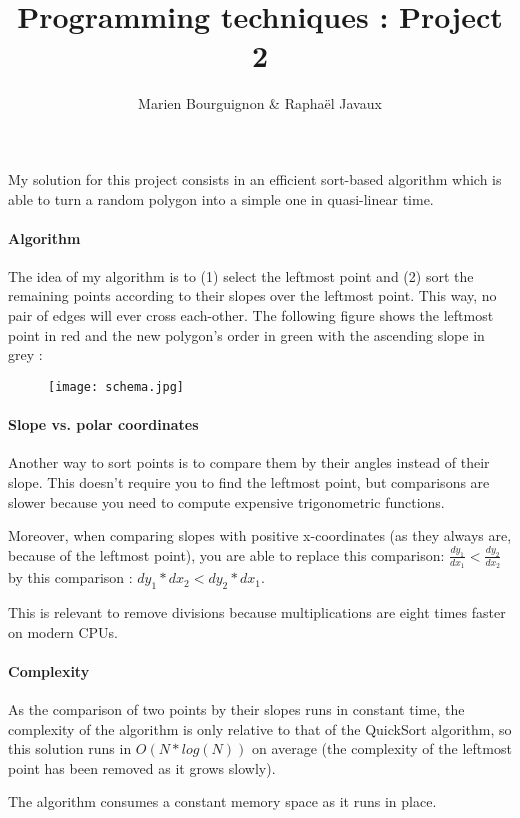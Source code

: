 \documentclass[a4paper]{article}
\title{Programming techniques : Project 2}
\author{Marien Bourguignon \& Raphaël Javaux}
\date{}
\begin{document}
\maketitle

    \paragraph{} My solution for this project consists in an efficient 
sort-based algorithm which is able to turn a random polygon into a simple one
in quasi-linear time.

    \paragraph{Algorithm} The idea of my algorithm is to (1) select the 
leftmost point and (2) sort the remaining points according to their slopes over
the leftmost point. This way, no pair of edges will ever cross each-other.
The following figure shows the leftmost point in red and the new polygon's order
in green with the ascending slope in grey :

    \begin{figure}[h]
        \centering
        \texttt{[image: schema.jpg]}
    \end{figure}

    \paragraph{Slope vs. polar coordinates} Another way to sort points is to
compare them by their angles instead of their slope. This doesn't require you to
find the leftmost point, but comparisons are slower because you need to compute
expensive trigonometric functions.

    Moreover, when comparing slopes with positive x-coordinates (as they always
are, because of the leftmost point), you are able to replace this comparison:
$\frac{dy_1}{dx_1} < \frac{dy_2}{dx_2}$ by this comparison : 
$dy_1 * dx_2 < dy_2 * dx_1$.

    This is relevant to remove divisions because multiplications are eight times
faster on modern CPUs.

     \paragraph{Complexity} As the comparison of two points by their slopes runs
in constant time, the complexity of the algorithm is only relative to that of
the QuickSort algorithm, so this solution runs in $O(N * log (N))$ on average
(the complexity of the leftmost point has been removed as it grows slowly).

    The algorithm consumes a constant memory space as it runs in place.
\end{document}
